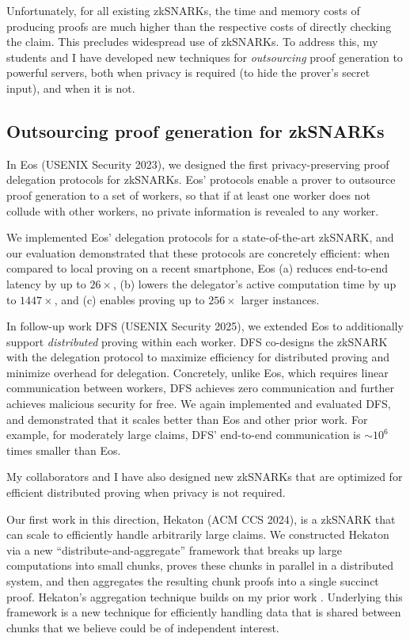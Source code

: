 \documentclass[11pt,letterpaper]{article}
\theoremstyle{definition} %
\theoremstyle{remark} %
\begin{document}
Unfortunately, for all existing zkSNARKs, the time and memory costs of producing proofs are much higher than the respective costs of directly checking the claim.
This precludes widespread use of zkSNARKs.
To address this, my students and I have developed new techniques for \emph{outsourcing} proof generation to powerful servers,  
 both when privacy is required (to hide the prover's secret input), and when it is not.
 
\subsection{Outsourcing proof generation for zkSNARKs}
\label{sec:outsourcing}

In Eos \cite{ChiesaLMZ23} (USENIX Security 2023), we designed the first privacy-preserving proof delegation protocols for zkSNARKs. 
Eos' protocols enable a prover to outsource proof generation to a set of workers, so that if at least one worker does not collude with other workers, no private information is revealed to any worker. 

We implemented Eos' delegation protocols for a state-of-the-art zkSNARK, and 
our evaluation demonstrated that these protocols are concretely efficient: when compared to local proving on a recent smartphone, Eos (a) reduces end-to-end latency by up to $26\times$, (b) lowers the delegator's active computation time by up to $1447\times$, and (c) enables proving up to $256\times$ larger instances.

In follow-up work DFS \cite{HuMWXYZ24} (USENIX Security 2025), we extended Eos to additionally support \emph{distributed} proving within each worker. 
DFS co-designs the zkSNARK with the delegation protocol to maximize efficiency for distributed proving and minimize overhead for delegation.
Concretely, unlike Eos, which requires linear communication between workers, DFS achieves zero communication and further achieves malicious security for free. 
We again implemented and evaluated DFS, and demonstrated that it scales better than Eos and other prior work. For example, for moderately large claims, DFS' end-to-end communication is $\sim 10^6$ times smaller than Eos. 


My collaborators and I have also designed new zkSNARKs that are optimized for efficient distributed proving when privacy is not required.

Our first work in this direction, Hekaton \cite{RosenbergMHMM24} (ACM CCS 2024), is a zkSNARK that can scale to efficiently handle arbitrarily large claims. 
We constructed Hekaton via a new ``distribute-and-aggregate'' framework that breaks up large computations into small chunks, proves these chunks in parallel in a distributed system, and then aggregates the resulting chunk proofs into a single succinct proof. 
Hekaton's aggregation technique builds on my prior work \cite{BunzMMTV21}.
Underlying this framework is a new technique for efficiently handling data that is shared between chunks that we believe could be of independent interest.
  
\end{document}

